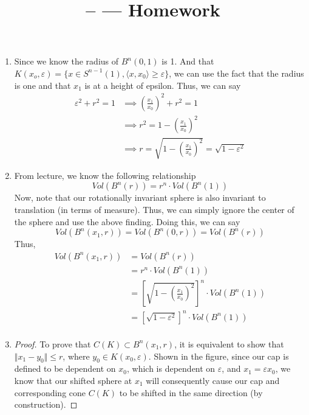 \documentclass[11pt]{article}
\title{\CRS -- \Session --- Homework \Homework} %
\author{\Name}
\date{}
\begin{document}
\maketitle

\begin{enumerate}
	\item Since we know the radius of $B^n(0,1)$ is 1. And that $K(x_o, \varepsilon) = \{ x \in S^{n-1}(1), \langle x,x_0 \rangle \ge \varepsilon \}$, we can use the fact that the radius is one and that $x_1$ is at a height of epsilon. Thus, we can say
	\begin{align*}
		\varepsilon^2 + r^2 = 1 &\implies \left( \frac{x_1}{x_0} \right)^2 + r^2 = 1 \\
		&\implies r^2= 1 - \left( \frac{x_1}{x_0} \right)^2 \\
		&\implies \boxed{r = \sqrt{1 - \left( \frac{x_1}{x_0} \right)^2} = \sqrt{1 - \varepsilon^2}}
	\end{align*}
	\item From lecture, we know the following relationship
	\begin{equation}
		Vol(B^n(r)) = r^n \cdot Vol(B^n(1))
	\end{equation}
	Now, note that our rotationally invariant sphere is also invariant to translation (in terms of measure). Thus, we can simply ignore the center of the sphere and use the above finding.
	Doing this, we can say
	\begin{equation}
		Vol(B^n(x_1, r)) = Vol(B^n(0, r)) = Vol(B^n(r))
	\end{equation}
	Thus,
	\begin{align*}
		Vol(B^n(x_1, r)) &= Vol(B^n(r)) \\
		&= r^n \cdot Vol(B^n(1)) \\
		&= \left[ \sqrt{1 - \left( \frac{x_1}{x_0}\right)^2 } \right]^n \cdot Vol(B^n(1)) \\
		&= \boxed{\left[ \sqrt{1 - \varepsilon^2 }\right]^n \cdot Vol(B^n(1))} \\
	\end{align*}
	\item
	\begin{proof}
	To prove that $C(K) \subset B^n(x_1, r)$, it is equivalent to show that $\Vert x_1 - y_0 \Vert \le r$, where $y_0 \in K(x_0, \varepsilon)$.
	Shown in the figure, since our cap is defined to be dependent on $x_0$, which is dependent on $\varepsilon$, and $x_1 = \varepsilon x_0$, we know that our shifted sphere at $x_1$ will consequently cause our cap and corresponding cone $C(K)$ to be shifted in the same direction (by construction).


\end{proof}
\end{enumerate}
\end{document}
